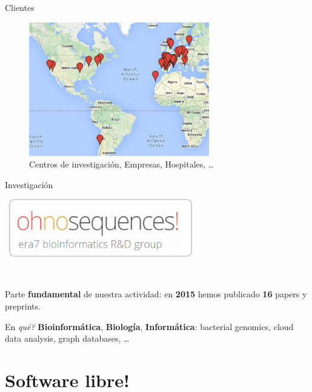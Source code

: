 \documentclass[12pt,compress]{beamer}
\let\OldHref\href
\renewcommand{\href}[2]{\OldHref[pdfnewwindow]{#1}{{\textbf{#2}}}}
\begin{document}
\begin{frame}{Clientes}

\begin{figure}[htbp]
\centering
\includegraphics[width=0.70000\textwidth]{images/clients.jpg}
\caption{Centros de investigación, Empresas, Hospitales, \ldots{}}
\end{figure}

\end{frame}

\begin{frame}{Investigación}

~\includegraphics[width=0.60000\textwidth]{images/ohnosequences.png}

~

Parte \textbf{fundamental} de nuestra actividad: en \textbf{2015} hemos
publicado \textbf{16} papers y preprints.

En \emph{qué?} \textbf{Bioinformática}, \textbf{Biología},
\textbf{Informática}: bacterial genomics, cloud data analysis, graph
databases, \ldots{}

\end{frame}

\section{Software libre!}\label{software-libre}

\end{document}
